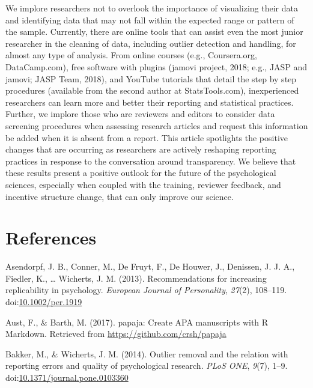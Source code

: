 \documentclass[english,man]{apa6}
\theoremstyle{definition}
\theoremstyle{definition}
\theoremstyle{definition}
\theoremstyle{remark}
\begin{document}
We implore researchers not to overlook the importance of visualizing
their data and identifying data that may not fall within the expected
range or pattern of the sample. Currently, there are online tools that
can assist even the most junior researcher in the cleaning of data,
including outlier detection and handling, for almost any type of
analysis. From online courses (e.g., Coursera.org, DataCamp.com), free
software with plugins (jamovi project, 2018; e.g., JASP and jamovi; JASP
Team, 2018), and YouTube tutorials that detail the step by step
procedures (available from the second author at StatsTools.com),
inexperienced researchers can learn more and better their reporting and
statistical practices. Further, we implore those who are reviewers and
editors to consider data screening procedures when assessing research
articles and request this information be added when it is absent from a
report. This article spotlights the positive changes that are occurring
as researchers are actively reshaping reporting practices in response to
the conversation around transparency. We believe that these results
present a positive outlook for the future of the psychological sciences,
especially when coupled with the training, reviewer feedback, and
incentive structure change, that can only improve our science.

\newpage

\section{References}\label{references}

\setlength{\parindent}{-0.5in} \setlength{\leftskip}{0.5in}

\hypertarget{refs}{}
\hypertarget{ref-Asendorpf2012}{}
Asendorpf, J. B., Conner, M., De Fruyt, F., De Houwer, J., Denissen, J.
J. A., Fiedler, K., \ldots{} Wicherts, J. M. (2013). Recommendations for
increasing replicability in psychology. \emph{European Journal of
Personality}, \emph{27}(2), 108--119.
doi:\href{https://doi.org/10.1002/per.1919}{10.1002/per.1919}

\hypertarget{ref-Aust2017}{}
Aust, F., \& Barth, M. (2017). papaja: Create APA manuscripts with R
Markdown. Retrieved from \url{https://github.com/crsh/papaja}

\hypertarget{ref-Bakker2014}{}
Bakker, M., \& Wicherts, J. M. (2014). Outlier removal and the relation
with reporting errors and quality of psychological research. \emph{PLoS
ONE}, \emph{9}(7), 1--9.
doi:\href{https://doi.org/10.1371/journal.pone.0103360}{10.1371/journal.pone.0103360}
\end{document}
